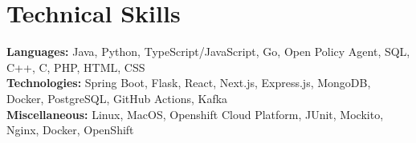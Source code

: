 \documentclass[letterpaper,11pt]{article}
\begin{document}
\section{Technical Skills}
 \begin{itemize}[leftmargin=0.15in, label={}]
    \small{\item{
     \textbf{Languages:}{ Java, Python, TypeScript/JavaScript, Go, Open Policy Agent, SQL, C++, C, PHP, HTML, CSS} \\
     \textbf{Technologies:}{ Spring Boot, Flask, React, Next.js, Express.js, MongoDB, Docker, PostgreSQL, GitHub Actions, Kafka } \\
     \textbf{Miscellaneous:}{ Linux, MacOS, Openshift Cloud Platform, JUnit, Mockito, Nginx, Docker, OpenShift } \\
    }}
 \end{itemize}


%
\end{document}
